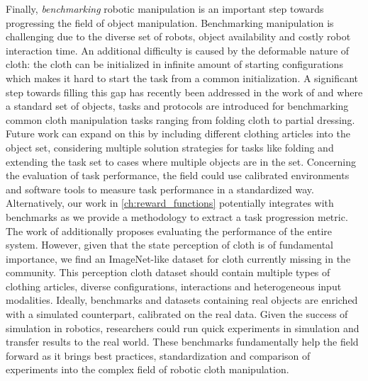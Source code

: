 \documentclass[\home/main.tex]{subfiles}
\begin{document}
Finally, \emph{benchmarking} robotic manipulation is an important step towards progressing the field of object manipulation. Benchmarking manipulation is challenging due to the diverse set of robots, object availability and costly robot interaction time. An additional difficulty is caused by the deformable nature of cloth: the cloth can be initialized in infinite amount of starting configurations which makes it hard to start the task from a common initialization. A significant step towards filling this gap has recently been addressed in the work of \autocite{Camacho2020} and \textcite{garciacamacho2021household} where a standard set of objects, tasks and protocols are introduced for benchmarking common cloth manipulation tasks ranging from folding cloth to partial dressing. Future work can expand on this by including different clothing articles into the object set, considering multiple solution strategies for tasks like folding and extending the task set to cases where multiple objects are in the set. Concerning the evaluation of task performance, the field could use calibrated environments and software tools to measure task performance in a standardized way. Alternatively, our work in \cref{ch:reward_functions} potentially integrates with benchmarks as we provide a methodology to extract a task progression metric. The work of \textcite{Camacho2020} additionally proposes evaluating the performance of the entire system. However, given that the state perception of cloth is of fundamental importance, we find an ImageNet-like dataset for cloth currently missing in the community. This perception cloth dataset should contain multiple types of clothing articles, diverse configurations, interactions and heterogeneous input modalities. 
Ideally, benchmarks and datasets containing real objects are enriched with a simulated counterpart, calibrated on the real data. Given the success of simulation in robotics, researchers could run quick experiments in simulation and transfer results to the real world. 
These benchmarks fundamentally help the field forward as it brings best practices, standardization and comparison of experiments into the complex field of robotic cloth manipulation. 

\end{document}
